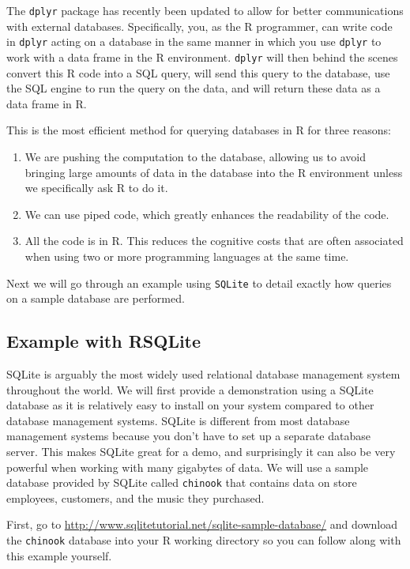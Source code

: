 \documentclass[
]{krantz}
\providecommand{\tightlist}{%
  \setlength{\itemsep}{0pt}\setlength{\parskip}{0pt}}
\begin{document}
The \texttt{dplyr} package has recently been updated to allow for better communications with external databases. Specifically, you, as the R programmer, can write code in \texttt{dplyr} acting on a database in the same manner in which you use \texttt{dplyr} to work with a data frame in the R environment. \texttt{dplyr} will then behind the scenes convert this R code into a SQL query, will send this query to the database, use the SQL engine to run the query on the data, and will return these data as a data frame in R.

This is the most efficient method for querying databases in R for three reasons:

\begin{enumerate}
\def\labelenumi{\arabic{enumi}.}
\tightlist
\item
  We are pushing the computation to the database, allowing us to avoid bringing large amounts of data in the database into the R environment unless we specifically ask R to do it.
\item
  We can use piped code, which greatly enhances the readability of the code.
\item
  All the code is in R. This reduces the cognitive costs that are often associated when using two or more programming languages at the same time.
\end{enumerate}

Next we will go through an example using \texttt{SQLite} to detail exactly how queries on a sample database are performed.

\hypertarget{example-with-rsqlite}{%
\subsection{Example with RSQLite}\label{example-with-rsqlite}}

SQLite is arguably the most widely used relational database management system throughout the world. We will first provide a demonstration using a SQLite database as it is relatively easy to install on your system compared to other database management systems. SQLite is different from most database management systems because you don't have to set up a separate database server. This makes SQLite great for a demo, and surprisingly it can also be very powerful when working with many gigabytes of data. We will use a sample database provided by SQLite called \texttt{chinook} that contains data on store employees, customers, and the music they purchased.

First, go to \url{http://www.sqlitetutorial.net/sqlite-sample-database/} and download the \texttt{chinook} database into your R working directory so you can follow along with this example yourself.
\end{document}
